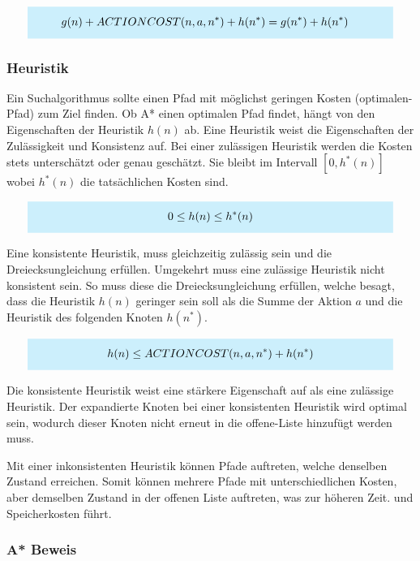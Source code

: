 \[
\highlightbox{0.9\textwidth}{$
    \begin{aligned}
			g(n) + ACTIONCOST(n,a,n^*) + h(n^*) &= g(n^*) + h(n^*)
    \end{aligned}
$}
\]

\subsubsection{Heuristik}

Ein Suchalgorithmus sollte einen Pfad mit möglichst geringen Kosten (optimalen-Pfad) zum Ziel finden. Ob A* einen optimalen Pfad findet, hängt von den Eigenschaften der Heuristik $h(n)$ ab. Eine Heuristik weist die Eigenschaften der Zulässigkeit und Konsistenz auf. Bei einer zulässigen Heuristik werden die Kosten stets unterschätzt oder genau geschätzt. Sie bleibt im Intervall $[0, h^{\ast}(n)]$ wobei $h^{\ast}(n)$ die tatsächlichen Kosten sind.

\[
\highlightbox{0.9\textwidth}{$
    \begin{aligned}
			0 \leq h(n) \leq h^*(n)
    \end{aligned}
$}
\]

Eine konsistente Heuristik, muss gleichzeitig zulässig sein und die Dreiecksungleichung erfüllen. Umgekehrt muss eine zulässige Heuristik nicht konsistent sein. So muss diese die Dreiecksungleichung erfüllen, welche besagt, dass die Heuristik $h(n)$ geringer sein soll als die Summe der Aktion $a$ und die Heuristik des folgenden Knoten $h(n^*)$.

\[
\highlightbox{0.9\textwidth}{$
    \begin{aligned}
			h(n) \leq ACTIONCOST(n,a,n^*) + h(n^*)
    \end{aligned}
$}
\]

Die konsistente Heuristik weist eine stärkere Eigenschaft auf als eine zulässige Heuristik. Der expandierte Knoten bei einer konsistenten Heuristik wird optimal sein, wodurch dieser Knoten nicht erneut in die offene-Liste hinzufügt werden muss.

Mit einer inkonsistenten Heuristik können Pfade auftreten, welche denselben Zustand erreichen. Somit können mehrere Pfade mit unterschiedlichen Kosten, aber demselben Zustand in der offenen Liste auftreten, was zur höheren Zeit. und Speicherkosten führt.

\subsubsection{A* Beweis}

